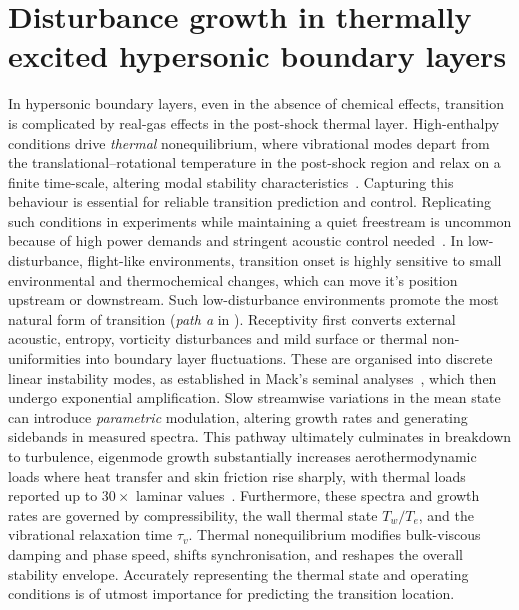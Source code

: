 \chapter{Disturbance growth in thermally excited hypersonic boundary layers}\label{chapter:disturbance_growth}

In hypersonic boundary layers, even in the absence of chemical effects,  transition is complicated by real-gas effects in the post-shock thermal layer. High-enthalpy conditions drive \emph{thermal} nonequilibrium, where vibrational modes depart from the translational--rotational temperature in the post-shock region and relax on a finite time-scale, altering modal stability characteristics~\citep{Candler2019}. Capturing this behaviour is essential for reliable transition prediction and control. Replicating such conditions in experiments while maintaining a quiet freestream is uncommon because of high power demands and stringent acoustic control needed~\citep{DiRenzo2021}. In low-disturbance, flight-like environments, transition onset is highly sensitive to small environmental and thermochemical changes, which can move it's position upstream or downstream. Such low-disturbance environments promote the most natural form of transition (\textit{path a} in ). Receptivity first converts external acoustic, entropy, vorticity disturbances and mild surface or thermal non-uniformities into boundary layer fluctuations. These are organised into discrete linear instability modes, as established in Mack's seminal analyses~\citep{Mack1984}, which then undergo exponential amplification. Slow streamwise variations in the mean state can introduce \emph{parametric} modulation, altering growth rates and generating sidebands in measured spectra. This pathway ultimately culminates in breakdown to turbulence, eigenmode growth substantially increases aerothermodynamic loads where heat transfer and skin friction rise sharply, with thermal loads reported up to $30\times$ laminar values~\citep{BitterShepherd2015}. Furthermore, these spectra and growth rates are governed by compressibility, the wall thermal state $T_w/T_e$, and the vibrational relaxation time $\tau_v$. Thermal nonequilibrium modifies bulk-viscous damping and phase speed, shifts synchronisation, and reshapes the overall stability envelope. Accurately representing the thermal state and operating conditions is of utmost importance for predicting the transition location.

